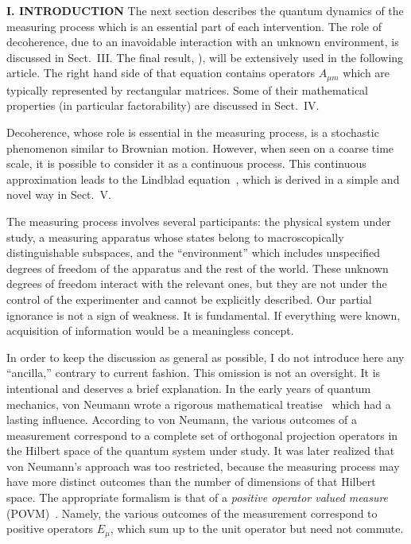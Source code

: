 \begin{center}{\bf I. INTRODUCTION}
The next section describes the quantum dynamics of the measuring process
which is an essential part of each intervention. The role of
decoherence, due to an inavoidable interaction with an unknown
environment, is discussed in Sect.~III. The final result, ),
will be extensively used in the following article. The right hand side
of that equation contains operators $A_{\mu m}$ which are typically
represented by rectangular matrices. Some of their mathematical
properties (in particular factorability) are discussed in Sect.~IV.

Decoherence, whose role is essential in the measuring process, is a
stochastic phenomenon similar to Brownian motion. However, when seen on
a coarse time scale, it is possible to consider it as a continuous
process. This continuous approximation leads to the Lindblad
equation~\cite{lindblad}, which is derived in a simple and novel way in
Sect.~V.

\ec

The measuring process involves several participants: the physical system
under study, a measuring apparatus whose states belong to
macroscopically distinguishable subspaces, and the ``environment'' which
includes unspecified degrees of freedom of the apparatus and the rest of
the world. These unknown degrees of freedom interact with the relevant
ones, but they are not under the control of the experimenter and cannot
be explicitly described. Our partial ignorance is not a sign of
weakness. It is fundamental. If everything were known, acquisition of
information would be a meaningless concept.

In order to keep the discussion as general as possible, I do not
introduce here any ``ancilla,'' contrary to current fashion. This
omission is not an oversight. It is intentional and deserves a brief
explanation. In the early years of quantum mechanics, von Neumann wrote
a rigorous mathematical treatise~\cite{vN} which had a lasting
influence. According to von Neumann, the various outcomes of a
measurement correspond to a complete set of orthogonal projection
operators in the Hilbert space of the quantum system under study. It was
later realized that von Neumann's approach was too restricted, because
the measuring process may have more distinct outcomes than the number of
dimensions of that Hilbert space. The appropriate formalism is that of a
{\it positive operator valued measure\/} (POVM)~\cite{JP,DL}. Namely,
the various outcomes of the measurement correspond to positive operators
$E_\mu$, which sum up to the unit operator but need not commute. 


\end{center}
